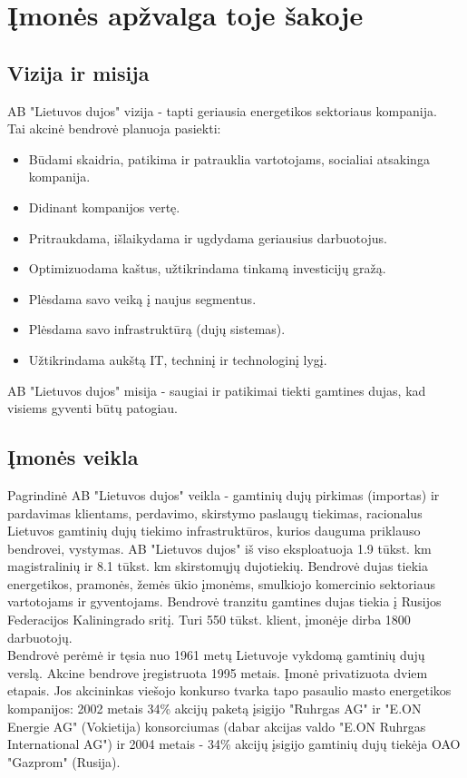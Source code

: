 \documentclass[11pt,a4paper]{article}
\begin{document}
\section{Įmonės apžvalga toje šakoje}

\subsection{Vizija ir misija}
AB "Lietuvos dujos" vizija - tapti geriausia energetikos sektoriaus kompanija.\\

Tai akcinė bendrovė planuoja pasiekti:
\begin{itemize}
	\item Būdami skaidria, patikima ir patrauklia vartotojams, socialiai atsakinga kompanija.
	\item Didinant kompanijos vertę.
	\item Pritraukdama, išlaikydama ir ugdydama geriausius darbuotojus.
	\item Optimizuodama kaštus, užtikrindama tinkamą investicijų gražą.
	\item Plėsdama savo veiką į naujus segmentus.
	\item Plėsdama savo infrastruktūrą (dujų sistemas).
	\item Užtikrindama aukštą IT, techninį ir technologinį lygį.
\end{itemize}

AB "Lietuvos dujos" misija - saugiai ir patikimai tiekti gamtines dujas, kad visiems gyventi būtų patogiau.

\subsection{Įmonės veikla}

Pagrindinė AB "Lietuvos dujos" veikla - gamtinių dujų pirkimas (importas) ir pardavimas klientams, perdavimo,
skirstymo paslaugų tiekimas, racionalus Lietuvos gamtinių dujų tiekimo infrastruktūros, kurios dauguma priklauso 
bendrovei, vystymas. AB "Lietuvos dujos" iš viso eksploatuoja 1.9 tūkst. km magistralinių ir 8.1 tūkst. km skirstomųjų 
dujotiekių. Bendrovė dujas tiekia energetikos, pramonės, žemės ūkio įmonėms, smulkiojo komercinio sektoriaus 
vartotojams ir gyventojams. Bendrovė tranzitu gamtines dujas tiekia į Rusijos Federacijos Kaliningrado sritį.
Turi 550 tūkst. klient, įmonėje dirba 1800 darbuotojų.\\

Bendrovė perėmė ir tęsia nuo 1961 metų Lietuvoje vykdomą gamtinių dujų verslą. Akcine bendrove įregistruota 1995 metais.
Įmonė privatizuota dviem etapais. Jos akcininkas viešojo konkurso tvarka tapo pasaulio masto energetikos kompanijos:
2002 metais 34\% akcijų paketą įsigijo "Ruhrgas AG" ir "E.ON Energie AG" (Vokietija) konsorciumas (dabar akcijas
valdo "E.ON Ruhrgas International AG") ir 2004 metais - 34\% akcijų įsigijo gamtinių dujų tiekėja OAO "Gazprom" (Rusija).\\
\end{document}
